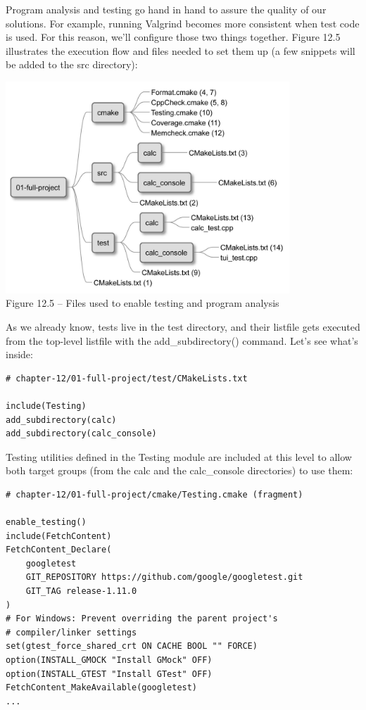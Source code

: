 

Program analysis and testing go hand in hand to assure the quality of our solutions. For example, running Valgrind becomes more consistent when test code is used. For this reason, we'll configure those two things together. Figure 12.5 illustrates the execution flow and files needed to set them up (a few snippets will be added to the src directory):

\begin{center}
\includegraphics[width=0.8\textwidth]{content/3/chapter12/images/5.jpg}\\
Figure 12.5 – Files used to enable testing and program analysis
\end{center}

As we already know, tests live in the test directory, and their listfile gets executed from the top-level listfile with the add\_subdirectory() command. Let's see what's inside:

\begin{lstlisting}[style=styleCMake]
# chapter-12/01-full-project/test/CMakeLists.txt

include(Testing)
add_subdirectory(calc)
add_subdirectory(calc_console)
\end{lstlisting}

Testing utilities defined in the Testing module are included at this level to allow both target groups (from the calc and the calc\_console directories) to use them:

\begin{lstlisting}[style=styleCMake]
# chapter-12/01-full-project/cmake/Testing.cmake (fragment)

enable_testing()
include(FetchContent)
FetchContent_Declare(
	googletest
	GIT_REPOSITORY https://github.com/google/googletest.git
	GIT_TAG release-1.11.0
)
# For Windows: Prevent overriding the parent project's
# compiler/linker settings
set(gtest_force_shared_crt ON CACHE BOOL "" FORCE)
option(INSTALL_GMOCK "Install GMock" OFF)
option(INSTALL_GTEST "Install GTest" OFF)
FetchContent_MakeAvailable(googletest)
...
\end{lstlisting}

